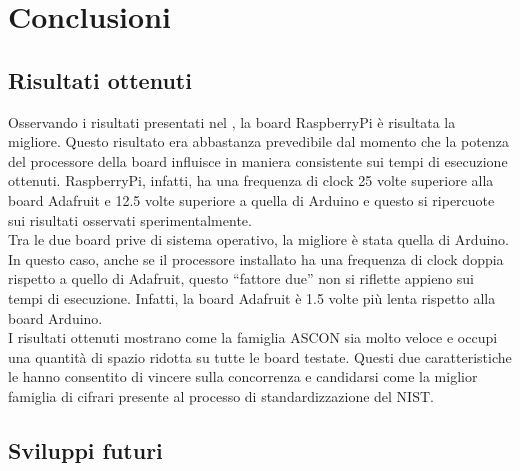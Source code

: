 \chapter{Conclusioni}

\section{Risultati ottenuti}

Osservando i risultati presentati nel , la board RaspberryPi è risultata la migliore. Questo risultato era abbastanza prevedibile dal momento che la potenza del processore della board influisce in maniera consistente sui tempi di esecuzione ottenuti. RaspberryPi, infatti, ha una frequenza di clock 25 volte superiore alla board Adafruit e 12.5 volte superiore a quella di Arduino e questo si ripercuote sui risultati osservati sperimentalmente. \\

\noindent Tra le due board prive di sistema operativo, la migliore è stata quella di Arduino. In questo caso, anche se il processore installato ha una frequenza di clock doppia rispetto a quello di Adafruit, questo ``fattore due'' non si riflette appieno sui tempi di esecuzione. Infatti, la board Adafruit è 1.5 volte più lenta rispetto alla board Arduino. \\

\noindent I risultati ottenuti mostrano come la famiglia ASCON sia molto veloce e occupi una quantità di spazio ridotta su tutte le board testate. Questi due caratteristiche le hanno consentito di vincere sulla concorrenza e candidarsi come la miglior famiglia di cifrari presente al processo di standardizzazione del NIST.

\section{Sviluppi futuri}

